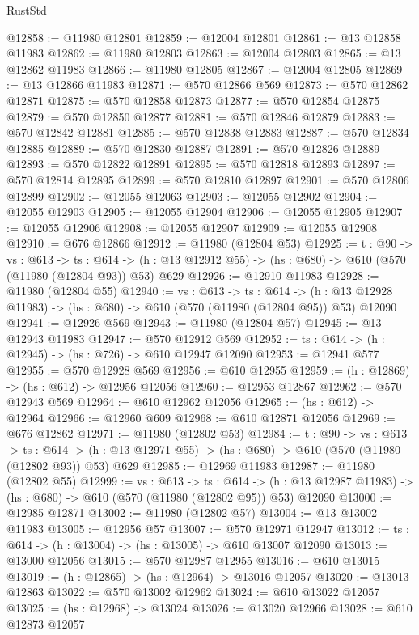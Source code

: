 \begin{lexlean}{RustStd}
\begin{coremodule}
@12858 := @11980 @12801
@12859 := @12004 @12801
@12861 := @13 @12858 @11983
@12862 := @11980 @12803
@12863 := @12004 @12803
@12865 := @13 @12862 @11983
@12866 := @11980 @12805
@12867 := @12004 @12805
@12869 := @13 @12866 @11983
@12871 := @570 @12866 @569
@12873 := @570 @12862 @12871
@12875 := @570 @12858 @12873
@12877 := @570 @12854 @12875
@12879 := @570 @12850 @12877
@12881 := @570 @12846 @12879
@12883 := @570 @12842 @12881
@12885 := @570 @12838 @12883
@12887 := @570 @12834 @12885
@12889 := @570 @12830 @12887
@12891 := @570 @12826 @12889
@12893 := @570 @12822 @12891
@12895 := @570 @12818 @12893
@12897 := @570 @12814 @12895
@12899 := @570 @12810 @12897
@12901 := @570 @12806 @12899
@12902 := @12055 @12063
@12903 := @12055 @12902
@12904 := @12055 @12903
@12905 := @12055 @12904
@12906 := @12055 @12905
@12907 := @12055 @12906
@12908 := @12055 @12907
@12909 := @12055 @12908
@12910 := @676 @12866
@12912 := @11980 (@12804 @53)
@12925 := {t : @90} ->
  {vs : @613} ->
  {ts : @614} -> (h : @13 @12912 @55) -> (hs : @680) -> @610 (@570 (@11980 (@12804 @93)) @53) @629
@12926 := @12910 @11983
@12928 := @11980 (@12804 @55)
@12940 := {vs : @613} ->
  {ts : @614} ->
  (h : @13 @12928 @11983) -> (hs : @680) -> @610 (@570 (@11980 (@12804 @95)) @53) @12090
@12941 := @12926 @569
@12943 := @11980 (@12804 @57)
@12945 := @13 @12943 @11983
@12947 := @570 @12912 @569
@12952 := {ts : @614} -> (h : @12945) -> (hs : @726) -> @610 @12947 @12090
@12953 := @12941 @577
@12955 := @570 @12928 @569
@12956 := @610 @12955
@12959 := (h : @12869) -> (hs : @612) -> @12956 @12056
@12960 := @12953 @12867
@12962 := @570 @12943 @569
@12964 := @610 @12962 @12056
@12965 := (hs : @612) -> @12964
@12966 := @12960 @609
@12968 := @610 @12871 @12056
@12969 := @676 @12862
@12971 := @11980 (@12802 @53)
@12984 := {t : @90} ->
  {vs : @613} ->
  {ts : @614} -> (h : @13 @12971 @55) -> (hs : @680) -> @610 (@570 (@11980 (@12802 @93)) @53) @629
@12985 := @12969 @11983
@12987 := @11980 (@12802 @55)
@12999 := {vs : @613} ->
  {ts : @614} ->
  (h : @13 @12987 @11983) -> (hs : @680) -> @610 (@570 (@11980 (@12802 @95)) @53) @12090
@13000 := @12985 @12871
@13002 := @11980 (@12802 @57)
@13004 := @13 @13002 @11983
@13005 := @12956 @57
@13007 := @570 @12971 @12947
@13012 := {ts : @614} -> (h : @13004) -> (hs : @13005) -> @610 @13007 @12090
@13013 := @13000 @12056
@13015 := @570 @12987 @12955
@13016 := @610 @13015
@13019 := (h : @12865) -> (hs : @12964) -> @13016 @12057
@13020 := @13013 @12863
@13022 := @570 @13002 @12962
@13024 := @610 @13022 @12057
@13025 := (hs : @12968) -> @13024
@13026 := @13020 @12966
@13028 := @610 @12873 @12057

\end{coremodule}
\end{lexlean}
